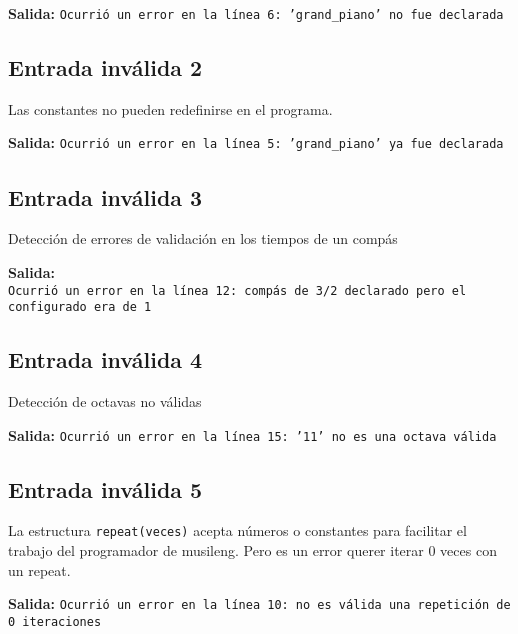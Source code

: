 \documentclass[a4paper,8pt]{article}
\begin{document}
\textbf{Salida:} \texttt{Ocurrió un error en la línea 6: 'grand\_piano' no fue declarada}


\subsection{Entrada inválida 2}
Las constantes no pueden redefinirse en el programa.
\begin{small}
  
\end{small}

\textbf{Salida:} \texttt{Ocurrió un error en la línea 5: 'grand\_piano' ya fue declarada}

\subsection{Entrada inválida 3}
Detección de errores de validación en los tiempos de un compás
\begin{small}
  
\end{small}

\textbf{Salida:}\\ \texttt{Ocurrió un error en la línea 12: compás de 3/2 declarado pero el configurado era de 1}
\subsection{Entrada inválida 4}
Detección de octavas no válidas
\begin{small}
  
\end{small}

\textbf{Salida:} \texttt{Ocurrió un error en la línea 15: '11' no es una octava válida}

\subsection{Entrada inválida 5}
La estructura \texttt{repeat(veces)} acepta números o constantes para facilitar el trabajo del programador de musileng. Pero es un error querer iterar 0 veces con un repeat.
\begin{small}
  
\end{small}

\textbf{Salida:} \texttt{Ocurrió un error en la línea 10: no es válida una repetición de 0 iteraciones}
\end{document}
